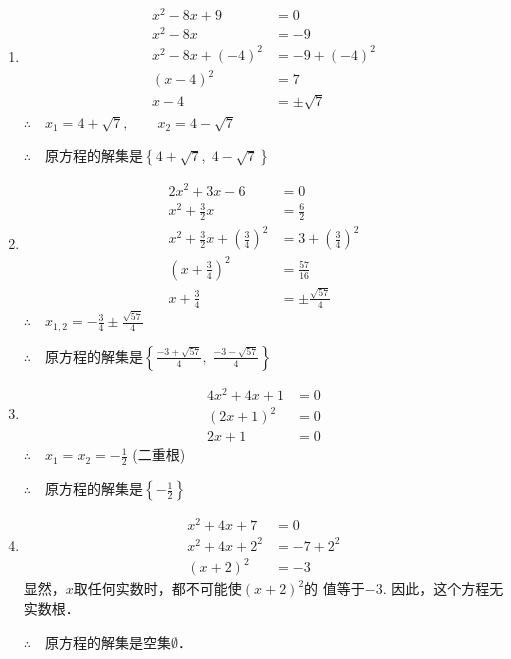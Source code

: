 \begin{solution}
\begin{enumerate}
    \item \begin{align*}
        x^2-8x+9&=0\\
        x^2-8x&=-9\tag{移项}\\
        x^2-8x+(-4)^2&=-9+(-4)^2 \tag{配方}\\
        (x-4)^2&=7\\
        x-4&=\pm\sqrt{7} \tag{平方根的意义}
    \end{align*}
$\therefore\quad x_1=4+\sqrt{7},\qquad x_2=4-\sqrt{7}$

$\therefore\quad $原方程的解集是$\left\{4+\sqrt{7},\; 4-\sqrt{7}\right\}$
    \item \begin{align*}
        2x^2+3x-6&=0\\
x^2+\frac{3}{2}x&=\frac{6}{2}\\
x^2+\frac{3}{2}x+\left(\frac{3}{4}\right)^2&=3+\left(\frac{3}{4}\right)^2\\
\left(x+\frac{3}{4}\right)^2&=\frac{57}{16}\\
x+\frac{3}{4}&=\pm\frac{\sqrt{57}}{4}
    \end{align*}
    $\therefore\quad x_{1,2}=-\frac{3}{4}\pm \frac{\sqrt{57}}{4}$

$\therefore\quad $原方程的解集是$\left\{\frac{-3+\sqrt{57}}{4},\; \frac{-3-\sqrt{57}}{4} \right\}$
    \item \begin{align*}
            4x^2+4x+1&=0\\
            (2x+1)^2&=0\\
            2x+1&=0
    \end{align*}
    $\therefore\quad x_{1}=x_2=-\frac{1}{2}$ (二重根)

$\therefore\quad $原方程的解集是$\left\{-\frac{1}{2}\right\}$
    \item \begin{align*}
        x^2+4x+7&=0\\
        x^2+4x+2^2&=-7+2^2\\
(x+2)^2&=-3
    \end{align*}
    显然，$x$取任何实数时，都不可能使$(x+2)^2$的
值等于$-3$. 因此，这个方程无实数根．

$\therefore\quad$原方程的解集是空集$\emptyset$．

\end{enumerate}
\end{solution}

